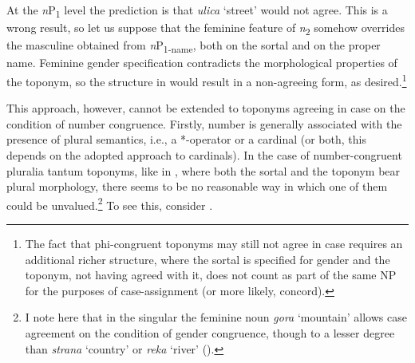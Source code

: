 \documentclass[output=paper,colorlinks,citecolor=brown]{langscibook}
\begin{document}
\ea\label{mat:ex:madam-KarmenIvanovna}
\z
\z

\noindent At the \textit{n}P\textsubscript{1} level the prediction is that \textit{ulica} ‘street’ would not agree. This is a wrong result, so let us suppose that the feminine feature of \textit{n}\textsubscript{2} somehow overrides the masculine obtained from \textit{n}P\textsubscript{1-name}, both on the sortal and on the proper name. Feminine gender specification contradicts the morphological properties of the toponym, so the structure in  would result in a non-agreeing form, as desired.\footnote{The fact that phi-congruent toponyms may still not agree in case requires an additional richer structure, where the sortal is specified for gender and the toponym, not having agreed with it, does not count as part of the same NP for the purposes of case-assignment (or more likely, concord).}

This approach, however, cannot be extended to toponyms agreeing in case on the condition of number congruence. Firstly, number is generally associated with the presence of plural semantics, i.e., a *-operator or a cardinal (or both, this depends on the adopted approach to cardinals). In the case of number-congruent pluralia tantum toponyms, like in , where both the sortal and the toponym bear plural morphology, there seems to be no reasonable way in which one of them could be unvalued.\footnote{I note here that in the singular the feminine noun \textit{gora} ‘mountain’ allows case agreement on the condition of gender congruence, though to a lesser degree than \textit{strana} ‘country’ or \textit{reka} ‘river’ (\citealt[22]{Logvinova2018}).} To see this, consider .
\end{document}
